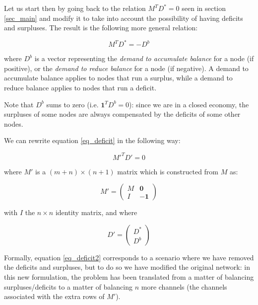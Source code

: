 \documentclass[a4paper]{article}
\begin{document}
Let us start then by going back to the relation $M^T D^* = 0$ seen in section \ref{sec_main} and modify it to take into account the possibility of having deficits and surpluses. The result is the following more general relation:

\begin{equation}\label{eq_deficit}
M^T D^* = -D^b
\end{equation}

where $D^b$ is a vector representing the \emph{demand to accumulate balance} for a node (if positive), or the \emph{demand to reduce balance} for a node (if negative). A demand to accumulate balance applies to nodes that run a surplus, while a demand to reduce balance applies to nodes that run a deficit.

Note that $D^b$ sums to zero (i.e. $\mathbf{1}^T D^b = 0$): since we are in a closed economy, the surpluses of some nodes are always compensated by the deficits of some other nodes.

We can rewrite equation \eqref{eq_deficit} in the following way:

\begin{equation}\label{eq_deficit2}
M'^T D' = 0
\end{equation}

where $M'$ is a $(m+n) \times (n+1)$ matrix which is constructed from $M$ as:

\begin{equation}
M' =
\begin{pmatrix}
M & \mathbf{0} \\
I & -\mathbf{1}
\end{pmatrix}
\end{equation}

with $I$ the $n \times n$ identity matrix, and where

\begin{equation}
D' =
\begin{pmatrix}
D^* \\
D^b
\end{pmatrix}
\end{equation}

Formally, equation \eqref{eq_deficit2} corresponds to a scenario where we have removed the deficits and surpluses, but to do so we have modified the original network: in this new formulation, the problem has been translated from a matter of balancing surpluses/deficits to a matter of balancing $n$ more channels (the channels associated with the extra rows of $M'$).
\end{document}
